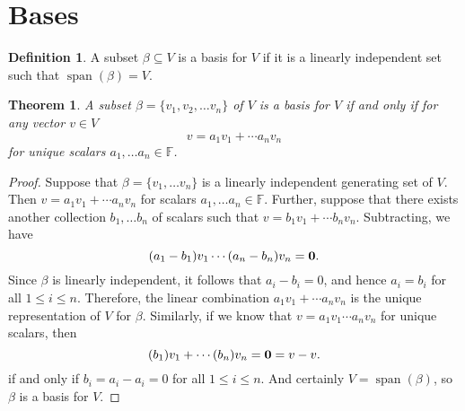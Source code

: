 \documentclass[oneside, 12pt]{book}
\DeclareMathOperator{\spn}{span}
\newtheorem{thm}{Theorem}[section]
\theoremstyle{definition}
\newtheorem{defn}{Definition}[section]
\begin{document}
\section{Bases}
\begin{defn}
  \label{defn_basis}
A subset $\beta \subseteq V $ is a basis for $V$ if it is a linearly independent set such that $\spn(\beta)=V$.
\end{defn}
\begin{thm}
  \label{thm_uniqbas}
A subset $\beta=\{v_{1},v_{2}, \dots v_{n}\}$ of $V$ is a basis for $V$ if and only if for any vector $v \in V$ \[v=a_{1}v_{1}+\cdots a_{n}v_{n}\] for unique scalars $a_{1}, \dots a_{n} \in \mathbb{F}$.
\end{thm}
\begin{proof}
Suppose that $\beta=\{v_{1}, \dots v_{n}\}$ is a linearly independent generating set of $V$. Then $v=a_{1}v_{1}+\cdots a_{n}v_{n}$ for scalars $a_{1}, \dots a_{n} \in \mathbb{F}$. Further, suppose that there exists another collection $b_{1}, \dots b_{n}$ of scalars such that $v=b_{1}v_{1}+\cdots b_{n}v_{n}$. Subtracting, we have \[(a_{1}-b_{1})v_{1}\cdots (a_{n}-b_{n})v_{n}=\bold{0}.\] Since $\beta$ is linearly independent, it follows that $a_{i}-b_{i}=0$, and hence $a_{i}=b_{i}$ for all $1 \leq i\leq n$. Therefore, the linear combination $a_{1}v_{1}+\cdots a_{n}v_{n}$ is the unique representation of $V$ for $\beta$. Similarly, if we know that $v=a_{1}v_{1}\cdots a_{n}v_{n}$ for unique scalars, then \[(b_{1})v_{1}+\cdots(b_{n})v_{n}=\bold{0}=v-v.\] if and only if $b_{i}=a_{i}-a_{i}=0$ for all $1 \leq i \leq n$. And certainly $V=\spn(\beta)$, so $\beta$ is a basis for $V$.
\end{proof}
\end{document}
